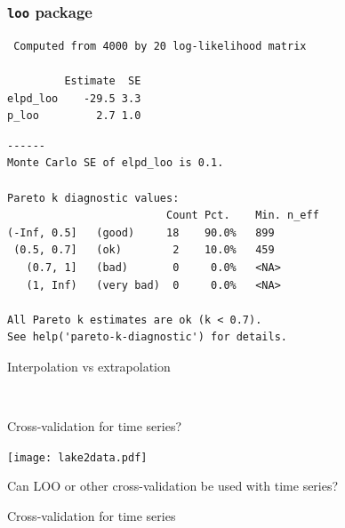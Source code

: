 \documentclass[english,t]{beamer}
\begin{document}
\begin{frame}[fragile]
  \frametitle{{\tt loo} package}

  {\scriptsize
\begin{lstlisting}
 Computed from 4000 by 20 log-likelihood matrix

         Estimate  SE
elpd_loo    -29.5 3.3
p_loo         2.7 1.0
\end{lstlisting}
      {\color{gray}
\begin{lstlisting}
------
Monte Carlo SE of elpd_loo is 0.1.

Pareto k diagnostic values:
                         Count Pct.    Min. n_eff
(-Inf, 0.5]   (good)     18    90.0%   899       
 (0.5, 0.7]   (ok)        2    10.0%   459       
   (0.7, 1]   (bad)       0     0.0%   <NA>      
   (1, Inf)   (very bad)  0     0.0%   <NA>      

All Pareto k estimates are ok (k < 0.7).
See help('pareto-k-diagnostic') for details.
\end{lstlisting}}
}
\end{frame}

\begin{frame}{Interpolation vs extrapolation}

  \\
  
\end{frame}

\begin{frame}{Cross-validation for time series?}

  \texttt{[image: lake2data.pdf]}

  
  {Can LOO or other cross-validation be used with time series?}
  
\end{frame}

\begin{frame}{Cross-validation for time series}

  \\
  
\end{frame}
\end{document}
